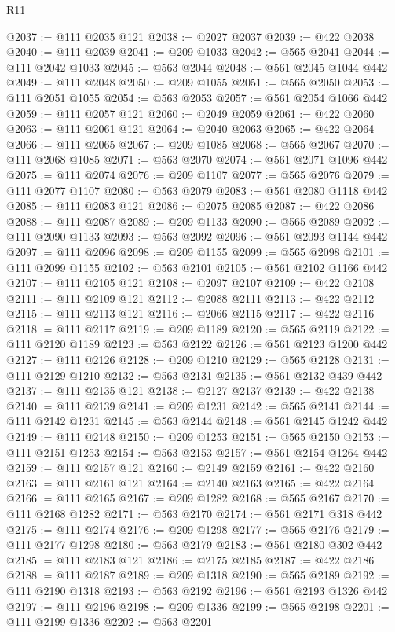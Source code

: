 \begin{lexlean}{R11}
\begin{coremodule}
{{{{{{{{{{{{{{{{{{{{{{{{{{{{{{{{{{{{{{{{{{{{{{{{{{{{{{{{{{{{{{{{{{{{{{{{{{{{{{{{{{@2037 := @111 @2035 @121
@2038 := @2027 @2037
@2039 := @422 @2038
@2040 := @111 @2039
@2041 := @209 @1033
@2042 := @565 @2041
@2044 := @111 @2042 @1033
@2045 := @563 @2044
@2048 := @561 @2045 @1044 @442
@2049 := @111 @2048
@2050 := @209 @1055
@2051 := @565 @2050
@2053 := @111 @2051 @1055
@2054 := @563 @2053
@2057 := @561 @2054 @1066 @442
@2059 := @111 @2057 @121
@2060 := @2049 @2059
@2061 := @422 @2060
@2063 := @111 @2061 @121
@2064 := @2040 @2063
@2065 := @422 @2064
@2066 := @111 @2065
@2067 := @209 @1085
@2068 := @565 @2067
@2070 := @111 @2068 @1085
@2071 := @563 @2070
@2074 := @561 @2071 @1096 @442
@2075 := @111 @2074
@2076 := @209 @1107
@2077 := @565 @2076
@2079 := @111 @2077 @1107
@2080 := @563 @2079
@2083 := @561 @2080 @1118 @442
@2085 := @111 @2083 @121
@2086 := @2075 @2085
@2087 := @422 @2086
@2088 := @111 @2087
@2089 := @209 @1133
@2090 := @565 @2089
@2092 := @111 @2090 @1133
@2093 := @563 @2092
@2096 := @561 @2093 @1144 @442
@2097 := @111 @2096
@2098 := @209 @1155
@2099 := @565 @2098
@2101 := @111 @2099 @1155
@2102 := @563 @2101
@2105 := @561 @2102 @1166 @442
@2107 := @111 @2105 @121
@2108 := @2097 @2107
@2109 := @422 @2108
@2111 := @111 @2109 @121
@2112 := @2088 @2111
@2113 := @422 @2112
@2115 := @111 @2113 @121
@2116 := @2066 @2115
@2117 := @422 @2116
@2118 := @111 @2117
@2119 := @209 @1189
@2120 := @565 @2119
@2122 := @111 @2120 @1189
@2123 := @563 @2122
@2126 := @561 @2123 @1200 @442
@2127 := @111 @2126
@2128 := @209 @1210
@2129 := @565 @2128
@2131 := @111 @2129 @1210
@2132 := @563 @2131
@2135 := @561 @2132 @439 @442
@2137 := @111 @2135 @121
@2138 := @2127 @2137
@2139 := @422 @2138
@2140 := @111 @2139
@2141 := @209 @1231
@2142 := @565 @2141
@2144 := @111 @2142 @1231
@2145 := @563 @2144
@2148 := @561 @2145 @1242 @442
@2149 := @111 @2148
@2150 := @209 @1253
@2151 := @565 @2150
@2153 := @111 @2151 @1253
@2154 := @563 @2153
@2157 := @561 @2154 @1264 @442
@2159 := @111 @2157 @121
@2160 := @2149 @2159
@2161 := @422 @2160
@2163 := @111 @2161 @121
@2164 := @2140 @2163
@2165 := @422 @2164
@2166 := @111 @2165
@2167 := @209 @1282
@2168 := @565 @2167
@2170 := @111 @2168 @1282
@2171 := @563 @2170
@2174 := @561 @2171 @318 @442
@2175 := @111 @2174
@2176 := @209 @1298
@2177 := @565 @2176
@2179 := @111 @2177 @1298
@2180 := @563 @2179
@2183 := @561 @2180 @302 @442
@2185 := @111 @2183 @121
@2186 := @2175 @2185
@2187 := @422 @2186
@2188 := @111 @2187
@2189 := @209 @1318
@2190 := @565 @2189
@2192 := @111 @2190 @1318
@2193 := @563 @2192
@2196 := @561 @2193 @1326 @442
@2197 := @111 @2196
@2198 := @209 @1336
@2199 := @565 @2198
@2201 := @111 @2199 @1336
@2202 := @563 @2201
}}}}}}}}}}}}}}}}}}}}}}}}}}}}}}}}}}}}}}}}}}}}}}}}}}}}}}}}}}}}}}}}}}}}}}}}}}}}}}}}}}
\end{coremodule}
\end{lexlean}

